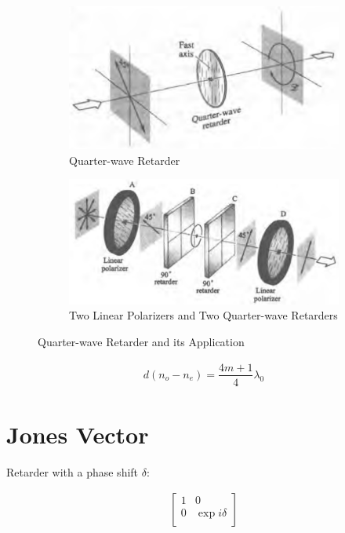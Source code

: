 \begin{figure}[H]
  \centering
  \begin{subfigure}{.45\textwidth}
    \centering
    \includegraphics[width=0.8\linewidth]{figures/Retarder}
    \caption{Quarter-wave Retarder}
  \end{subfigure}
  \begin{subfigure}{.5\textwidth}
    \centering
    \includegraphics[width=0.9\linewidth]{figures/Retarder2}
    \caption{Two Linear Polarizers and Two Quarter-wave Retarders}
  \end{subfigure}
  \caption{Quarter-wave Retarder and its Application}
\end{figure}

\begin{equation*}
  \begin{aligned}
    d \left( n_o - n_e \right) = \dfrac{4 m + 1}{4} \lambda_0 
  \end{aligned}
\end{equation*}

\section{Jones Vector}

Retarder with a phase shift $\delta$:

\begin{equation*}
  \begin{aligned}
    \left[
      \begin{array}{ccc}
       1 & 0 \\
       0 & \exp{i\delta} \\
      \end{array}
    \right ]
  \end{aligned}
\end{equation*}

